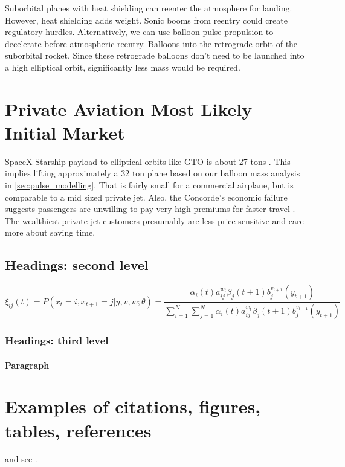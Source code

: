 \documentclass{article}
\begin{document}
Suborbital planes with heat shielding can reenter the atmosphere for landing.   However, heat shielding adds weight.   Sonic booms from reentry could create regulatory hurdles.   Alternatively, we can use balloon pulse propulsion to decelerate before atmospheric reentry.   Balloons into the retrograde orbit of the suborbital rocket.   Since these retrograde balloons don't need to be launched into a high elliptical orbit, significantly less mass would be required.

\section{Private Aviation Most Likely Initial Market}
SpaceX Starship payload to elliptical orbits like GTO is about 27 tons \cite{spacex_user_guide}.   This implies lifting approximately a 32 ton plane based on our balloon mass analysis in \autoref{sec:pulse_modelling}.   That is fairly small for a commercial airplane, but is comparable to a mid sized private jet.   Also, the Concorde's economic failure suggests passengers are unwilling to pay very high premiums for faster travel \cite{concorde_expensive}.  The wealthiest private jet customers presumably are less price sensitive and care more about saving time.



\subsection{Headings: second level}
\lipsum[5]
\begin{equation}
\xi _{ij}(t)=P(x_{t}=i,x_{t+1}=j|y,v,w;\theta)= {\frac {\alpha _{i}(t)a^{w_t}_{ij}\beta _{j}(t+1)b^{v_{t+1}}_{j}(y_{t+1})}{\sum _{i=1}^{N} \sum _{j=1}^{N} \alpha _{i}(t)a^{w_t}_{ij}\beta _{j}(t+1)b^{v_{t+1}}_{j}(y_{t+1})}}
\end{equation}

\subsubsection{Headings: third level}
\lipsum[6]

\paragraph{Paragraph}
\lipsum[7]

\section{Examples of citations, figures, tables, references}
\label{sec:others}
\lipsum[8] \cite{kour2014real,kour2014fast} and see \cite{hadash2018estimate}.
\end{document}

